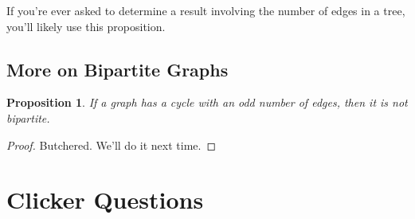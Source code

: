 \documentclass[]{article}
\newtheorem*{proposition}{Proposition}
\theoremstyle{definition}
\begin{document}
			If you're ever asked to determine a result involving the number of edges in a tree, you'll likely use this proposition.

		\subsection{More on Bipartite Graphs}
			\begin{proposition}
				If a graph has a cycle with an odd number of edges, then it is not bipartite.
			\end{proposition}

			\begin{proof}
				Butchered. We'll do it next time.
			\end{proof}
	\newpage
	\section*{Clicker Questions}
\end{document}
